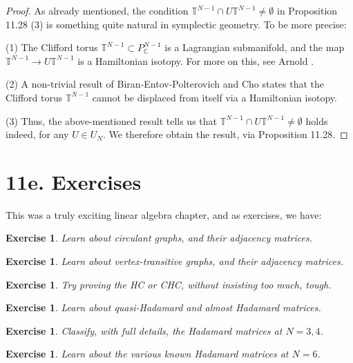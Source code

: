 \documentclass[12pt]{amsbook}
\newtheorem{exercise}[theorem]{Exercise}
\begin{document}
\begin{proof}
As already mentioned, the condition $\mathbb T^{N-1}\cap U\mathbb T^{N-1}\neq\emptyset$ in Proposition 11.28 (3) is something quite natural in symplectic geometry. To be more precise:

\medskip

(1) The Clifford torus $\mathbb T^{N-1}\subset P^{N-1}_\mathbb C$ is a Lagrangian submanifold, and the map $\mathbb T^{N-1}\to U\mathbb T^{N-1}$ is a Hamiltonian isotopy. For more on this, see Arnold \cite{ar2}.

\medskip

(2) A non-trivial result of Biran-Entov-Polterovich and Cho states that the Clifford torus $\mathbb T^{N-1}$ cannot be displaced from itself via a Hamiltonian isotopy.

\medskip

(3) Thus, the above-mentioned result tells us that  $\mathbb T^{N-1}\cap U\mathbb T^{N-1}\neq\emptyset$ holds indeed, for any $U\in U_N$. We therefore obtain the result, via Proposition 11.28. 
\end{proof}

\section*{11e. Exercises}

This was a truly exciting linear algebra chapter, and as exercises, we have:

\begin{exercise}
Learn about circulant graphs, and their adjacency matrices.
\end{exercise}

\begin{exercise}
Learn about vertex-transitive graphs, and their adjacency matrices.
\end{exercise}

\begin{exercise}
Try proving the HC or CHC, without insisting too much, tough.
\end{exercise}

\begin{exercise}
Learn about quasi-Hadamard and almost Hadamard matrices.
\end{exercise}

\begin{exercise}
Classify, with full details, the Hadamard matrices at $N=3,4$.
\end{exercise}

\begin{exercise}
Learn about the various known Hadamard matrices at $N=6$.
\end{exercise}
\end{document}
